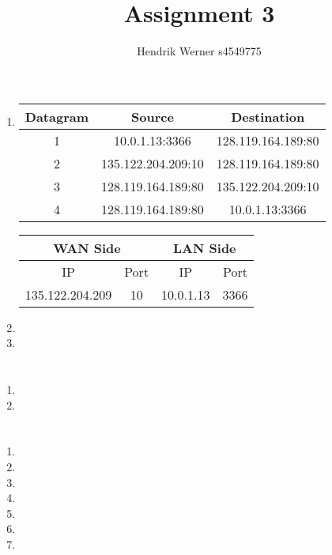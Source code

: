 \documentclass[12pt, a4paper]{article}
\title{Assignment 3}
\author{Hendrik Werner s4549775}
\begin{document}
\maketitle

\section{} %
\begin{enumerate}[a]
	\item %
	\begin{tabular}{|c|c|c|}
		\hline
		Datagram & Source & Destination\\\hline
		1 & 10.0.1.13:3366 & 128.119.164.189:80\\
		2 & 135.122.204.209:10 & 128.119.164.189:80\\
		3 & 128.119.164.189:80 & 135.122.204.209:10\\
		4 & 128.119.164.189:80 & 10.0.1.13:3366\\
		\hline
	\end{tabular}

	\begin{tabular}{|c|c|c|c|}
		\hline
		\multicolumn{2}{|c|}{WAN Side} & \multicolumn{2}{|c|}{LAN Side}\\\hline
		IP & Port & IP & Port\\\hline
		135.122.204.209 & 10 & 10.0.1.13 & 3366\\
		\hline
	\end{tabular}

	\item %
	\item %
\end{enumerate}

\section{} %
\begin{enumerate}[a]
	\item %
	\item %
\end{enumerate}

\section{} %
\begin{enumerate}[1]
	\item %
	\item %
	\item %
	\item %
	\item %
	\item %
	\item %
\end{enumerate}
\end{document}
